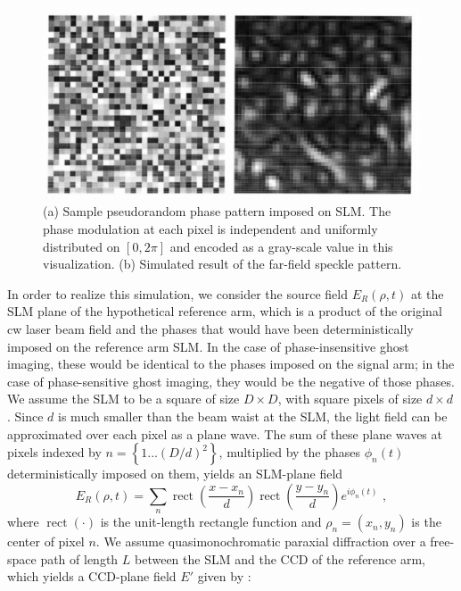 \begin{figure}[t]
\begin{center}
\includegraphics[width=13cm]{figure-ghost-slm-speckle.pdf}
\caption{(a) Sample pseudorandom phase pattern imposed on SLM. The phase modulation at each pixel is independent and uniformly distributed on $\left[0, 2\pi \right]$ and encoded as a gray-scale value in this visualization. (b) Simulated result of the far-field speckle pattern.}
\label{figure:ghost-slm-speckle}
\end{center}
\end{figure}

In order to realize this simulation, we consider the source field $E_R(\rho, t)$ at the SLM plane of the hypothetical reference arm, which is a product of the original cw laser beam field and the phases that would have been deterministically imposed on the reference arm SLM. In the case of phase-insensitive ghost imaging, these would be identical to the phases imposed on the signal arm; in the case of phase-sensitive ghost imaging, they would be the negative of those phases. We assume the SLM to be a square of size $D \times D$, with square pixels of size $d \times d$. Since $d$ is much smaller than the beam waist at the SLM, the light field can be approximated over each pixel as a plane wave. The sum of these plane waves at pixels indexed by $n = \left\{1 ... (D/d)^2\right\}$, multiplied by the phases $\phi_n(t)$ deterministically imposed on them, yields an SLM-plane field
\begin{equation}
E_R(\rho, t) = \sum_n \operatorname{rect}\left(\frac{x-x_n}{d}\right) \operatorname{rect}\left(\frac{y-y_n}{d}\right) e^{i\phi_n(t)}\,\,,
\end{equation}
where $\operatorname{rect}(\cdot)$ is the unit-length rectangle function and $\rho_n = (x_n,y_n)$ is the center of pixel $n$. We assume quasimonochromatic paraxial diffraction over a free-space path of length $L$ between the SLM and the CCD of the reference arm, which yields a CCD-plane field $E'$ given by \cite{hardy-thesis}:

